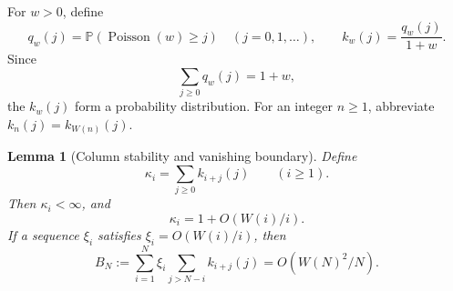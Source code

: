 \documentclass[11pt]{article}
\numberwithin{equation}{section}
\newtheorem{lemma}[theorem]{Lemma}
\theoremstyle{definition}
\theoremstyle{remark}
\DeclareMathOperator{\Poisson}{Poisson}
\begin{document}
For \(w>0\), define
\[
 q_w(j)=\mathbb P(\Poisson (w)\ge j)
 \quad(j=0,1,\ldots),
 \qquad
 k_w(j)=\frac{q_w(j)}{1+w}.
\]
Since
\[
 \sum_{j\ge0}q_w(j)=1+w,
\]
the \(k_w(j)\) form a probability distribution.
For an integer \(n\ge1\), abbreviate
\(k_n(j)=k_{W(n)}(j)\).

\begin{lemma}[Column stability and vanishing boundary]\label{bnc:lem:columns}
Define
\[
 \kappa_i=\sum_{j\ge0}k_{i+j}(j)\qquad(i\ge1).
\]
Then \(\kappa_i<\infty\), and
\begin{equation}\label{bnc:eq:bell-22}
\kappa_i=1+O(W(i)/i).
\end{equation}
If a sequence \(\xi_i\) satisfies \(\xi_i=O(W(i)/i)\), then
\begin{equation}\label{bnc:eq:bell-23}
B_N:=
 \sum_{i=1}^{N}\xi_i
       \sum_{j>N-i}k_{i+j}(j)
 =O(W(N)^2/N).
\end{equation}
\end{lemma}
\end{document}
